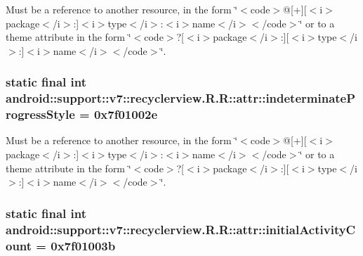 Must be a reference to another resource, in the form \char`\"{}$<$code$>$@\mbox{[}+\mbox{]}\mbox{[}$<$i$>$package$<$/i$>$:\mbox{]}$<$i$>$type$<$/i$>$:$<$i$>$name$<$/i$>$$<$/code$>$\char`\"{} or to a theme attribute in the form \char`\"{}$<$code$>$?\mbox{[}$<$i$>$package$<$/i$>$:\mbox{]}\mbox{[}$<$i$>$type$<$/i$>$:\mbox{]}$<$i$>$name$<$/i$>$$<$/code$>$\char`\"{}. \hypertarget{classandroid_1_1support_1_1v7_1_1recyclerview_1_1_r_1_1attr_830a6af106245e3ddd6db3b9662a913c}{
\subsubsection[{indeterminateProgressStyle}]{\setlength{\rightskip}{0pt plus 5cm}static final int android::support::v7::recyclerview.R.R::attr::indeterminateProgressStyle = 0x7f01002e}}
\label{classandroid_1_1support_1_1v7_1_1recyclerview_1_1_r_1_1attr_830a6af106245e3ddd6db3b9662a913c}


Must be a reference to another resource, in the form \char`\"{}$<$code$>$@\mbox{[}+\mbox{]}\mbox{[}$<$i$>$package$<$/i$>$:\mbox{]}$<$i$>$type$<$/i$>$:$<$i$>$name$<$/i$>$$<$/code$>$\char`\"{} or to a theme attribute in the form \char`\"{}$<$code$>$?\mbox{[}$<$i$>$package$<$/i$>$:\mbox{]}\mbox{[}$<$i$>$type$<$/i$>$:\mbox{]}$<$i$>$name$<$/i$>$$<$/code$>$\char`\"{}. \hypertarget{classandroid_1_1support_1_1v7_1_1recyclerview_1_1_r_1_1attr_8daf1058bc756fd13cb2b6539c3c7692}{
\subsubsection[{initialActivityCount}]{\setlength{\rightskip}{0pt plus 5cm}static final int android::support::v7::recyclerview.R.R::attr::initialActivityCount = 0x7f01003b}}
\label{classandroid_1_1support_1_1v7_1_1recyclerview_1_1_r_1_1attr_8daf1058bc756fd13cb2b6539c3c7692}



